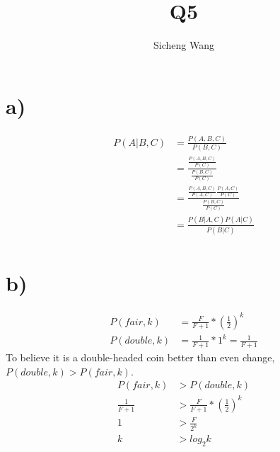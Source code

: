 \documentclass{article}
\title{Q5}
\author{Sicheng Wang}
\begin{document}
\maketitle

\section{a)}

\begin{align*}
	P(A|B,C) &= \frac{P(A,B,C)}{P(B,C)}\\
						&= \frac{\frac{P(A,B,C)}{P(C)}}{\frac{P(B,C)}{P(C)}}\\
						&= \frac{\frac{P(A,B,C)}{P(A,C)}\frac{P(A,C)}{P(C)}}{\frac{P(B,C)}{P(C)}}\\
						&= \frac{P(B|A,C)P(A|C)}{P(B|C)}\\
\end{align*}

\section{b)}

\begin{align*}
	P(fair, k) &= \frac{F}{F+1} * (\frac{1}{2})^k\\
	P(double, k) &= \frac{1}{F+1} * 1^k = \frac{1}{F+1}
\end{align*}
To believe it is a double-headed coin better than even change, $P(double, k) > P(fair, k)$.
\begin{align*}
	P(fair, k) &> P(double, k)\\
	\frac{1}{F+1} &> \frac{F}{F+1} * (\frac{1}{2})^k\\
	1 &> \frac{F}{2^k}\\
	k &> log_2k
\end{align*}
\end{document}
